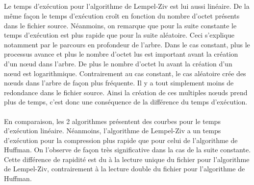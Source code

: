 \documentclass{report}
\begin{document}
\subparagraph*{}
Le temps d'exécution pour l'algorithme de Lempel-Ziv est lui aussi linéaire. De la même façon le temps d'exécution croît en fonction du nombre d'octet présents dans le fichier source. Néanmoins, on remarque que pour la suite constante le temps d'exécution est plus rapide que pour la suite aléatoire. Ceci s'explique notamment par le parcours en profondeur de l'arbre. Dans le cas constant, plus le processus avance et plus le nombre d'octet lus est important avant la création d'un nœud dans l'arbre. De plus le nombre d'octet lu avant la création d'un nœud est logarithmique. Contrairement au cas constant, le cas aléatoire crée des nœuds dans l'arbre de façon plus fréquente. Il y a tout simplement moins de redondance dans le fichier source. Ainsi la création de ces multiples nœuds prend plus de temps, c'est donc une conséquence de la différence du temps d'exécution.

\paragraph*{}
En comparaison, les 2 algorithmes présentent des courbes pour le temps d'exécution linéaire. Néanmoins, l'algorithme de Lempel-Ziv a un temps d'exécution pour la compression plus rapide que pour celui de l'algorithme de Huffman. On l'observe de façon très significative dans la cas de la suite constante. Cette différence de rapidité est du à la lecture unique du fichier pour l'algorithme de Lempel-Ziv, contrairement à la lecture double du fichier pour l'algorithme de Huffman.	

\paragraph*{}
\end{document}
